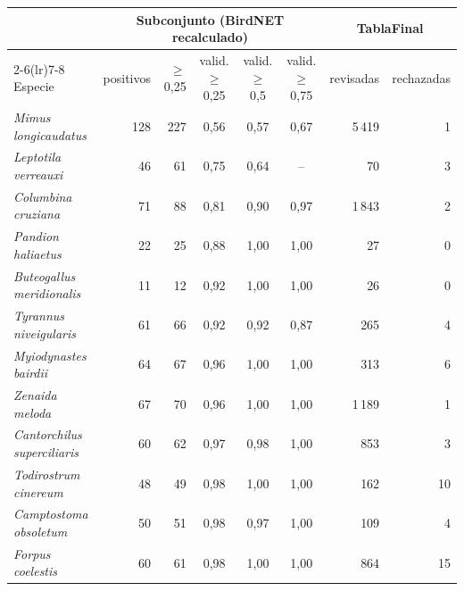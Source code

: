 \begin{tabular}{lrrcccrr}
\toprule
 & \multicolumn{5}{c}{Subconjunto (BirdNET recalculado)} & \multicolumn{2}{c}{TablaFinal}\\
\cmidrule(lr){2-6}\cmidrule(lr){7-8}
Especie & positivos & $\geq$0,25 & valid. $\geq$0,25 & valid. $\geq$0,5 & valid. $\geq$0,75 & revisadas & rechazadas\\
\midrule
\textit{Mimus longicaudatus} & 128 & 227 & 0{,}56 & 0{,}57 & 0{,}67 & 5\,419 & 1\\
\textit{Leptotila verreauxi} & 46 & 61 & 0{,}75 & 0{,}64 & -- & 70 & 3\\
\textit{Columbina cruziana} & 71 & 88 & 0{,}81 & 0{,}90 & 0{,}97 & 1\,843 & 2\\
\textit{Pandion haliaetus} & 22 & 25 & 0{,}88 & 1{,}00 & 1{,}00 & 27 & 0\\
\textit{Buteogallus meridionalis} & 11 & 12 & 0{,}92 & 1{,}00 & 1{,}00 & 26 & 0\\
\textit{Tyrannus niveigularis} & 61 & 66 & 0{,}92 & 0{,}92 & 0{,}87 & 265 & 4\\
\textit{Myiodynastes bairdii} & 64 & 67 & 0{,}96 & 1{,}00 & 1{,}00 & 313 & 6\\
\textit{Zenaida meloda} & 67 & 70 & 0{,}96 & 1{,}00 & 1{,}00 & 1\,189 & 1\\
\textit{Cantorchilus superciliaris} & 60 & 62 & 0{,}97 & 0{,}98 & 1{,}00 & 853 & 3\\
\textit{Todirostrum cinereum} & 48 & 49 & 0{,}98 & 1{,}00 & 1{,}00 & 162 & 10\\
\textit{Camptostoma obsoletum} & 50 & 51 & 0{,}98 & 0{,}97 & 1{,}00 & 109 & 4\\
\textit{Forpus coelestis} & 60 & 61 & 0{,}98 & 1{,}00 & 1{,}00 & 864 & 15\\
\bottomrule
\end{tabular}
